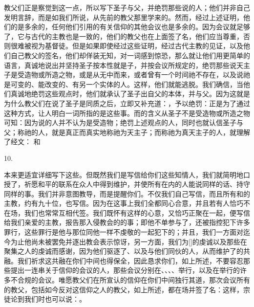 教父们正是察觉到这一点，所以写下圣子与父，并绝罚那些说的人；他们并非自己发明言辞，而是如我们所说，从先前的教父那里学来的。然而，经过上述证明，他们的是多余的，任何他们引用的有关信仰的其他会议也是多余的。因为会议就足够了，它与古代的主教也是一致的，他们的教父也在上面签了名，他们应当尊重，否则很难被视为基督徒。但是如果即使经过这些证明，经过古代主教的见证，以及他们自己教父的签名，他们却佯装无知，对一词感到惊恐，那么就让他们用更简单的语言，真诚地说出并坚持圣子按本性就是子，并按会议所规定的，绝罚那些说天主子是受造物或所造之物，或是从无中而来，或者曾有一个时间祂不存在，以及说祂是可变的、能改变的、有另一个实体的人。这样，他们就能逃脱。我们确信，当他们真诚地绝罚这些观点时，他们就承认了圣子出自父的本体，并与父。因为这就是为什么教父们在说了圣子是同质之后，立即又补充道：，予以绝罚：正是为了通过这种方式，让人明白一词所指的是这些事。而的含义从圣子不是受造物或所造之物可知：因为说的人并不认为是受造物；绝罚上述观点的人，同时也就认信圣子与父；称祂的人，就是真正而真实地称祂为天主子；而称祂为真天主子的人，就理解了经文： 和 \par

10. \par

本来更适宜详细写下这些。但既然我们是写信给你们这些知情人，我们就简明地口授了，祈愿和平的联系在众人中得到维护，并使所有在内的人能说同样的话、持守同样的事。我们并非意图教导，而是提醒你们。不仅我们自己写信，而且所有和的主教，约有九十位，也写信。因为在这事上我们全都同心合意，并且若有人恰巧不在场，我们也常常互相代签。我们既怀有这样的心意，又恰巧正聚在一起，便写信给我们亲爱的主教，报告那入侵教会的的事；即他不单参与了，还被指控犯下许多罪行，这些罪行是他与那位同他一样不虔敬的一起犯下的；并且，我们一方面对迄今为止他尚未被罢免并逐出教会表示惊讶，另一方面，我们为[]的虔诚以及那些在聚集之人的虔诚而感谢，因为他们驱逐了、以及与他们同伙的人，从而维护了的共融。我们祈求这共融在你们中间也得保全，因此恳求你们，如上所述，不要容忍那些提出一连串关于信仰的会议的人，那些会议分别在、、、、举行，以及在举行的许多不合规的会议。唯愿教父们在所宣认的信仰在你们中间独行其道，那次会议所有的教父，包括如今反对这信仰之人的教父，如上所述，都在场并签了名：这样，宗徒论到我们时也可以说：。\par

